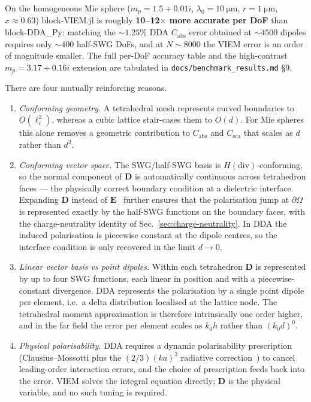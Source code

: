 \documentclass[11pt,a4paper]{article}
\begin{document}
On the homogeneous Mie sphere ($m_p = 1.5 + 0.01 i$,
$\lambda_0 = \SI{10}{\micro\metre}$, $r = \SI{1}{\micro\metre}$,
$x \approx 0.63$) block-VIEM.jl is roughly \textbf{10--12$\times$
more accurate per DoF} than block-DDA\_Py: matching the
$\sim 1.25\%$ DDA $C_{\text{abs}}$ error obtained at $\sim 4500$
dipoles requires only $\sim 400$ half-SWG DoFs, and at $N \sim 8000$
the VIEM error is an order of magnitude smaller.  The full
per-DoF accuracy table and the high-contrast $m_p = 3.17 + 0.16 i$
extension are tabulated in
\texttt{docs/benchmark\_results.md} \S 9.

There are four mutually reinforcing reasons.
\begin{enumerate}
  \item \emph{Conforming geometry.} A tetrahedral mesh represents
        curved boundaries to $O(\ell_c^{2})$, whereas a cubic lattice
        stair-cases them to $O(d)$. For Mie spheres this alone removes
        a geometric contribution to $C_{\text{abs}}$ and
        $C_{\text{sca}}$ that scales as $d$ rather than $d^{2}$.
  \item \emph{Conforming vector space.} The SWG/half-SWG basis is
        $H(\mathrm{div})$-conforming, so the normal component of
        $\bm{D}$ is automatically continuous across tetrahedron faces
        --- the physically correct boundary condition at a dielectric
        interface. Expanding $\bm{D}$ instead of
        $\bm{E}$~\cite[Sec.~II.B]{SWG1984} further ensures that the
        polarisation jump at $\partial\Omega$ is represented exactly
        by the half-SWG functions on the boundary faces, with the
        charge-neutrality identity of Sec.~\ref{sec:charge-neutrality}.
        In DDA the induced polarisation is piecewise constant at the
        dipole centres, so the interface condition is only recovered
        in the limit $d\to 0$.
  \item \emph{Linear vector basis vs point dipoles.} Within each
        tetrahedron $\bm{D}$ is represented by up to four SWG
        functions, each linear in position and with a piecewise-constant
        divergence. DDA represents the polarisation by a single point
        dipole per element, i.e.\ a delta distribution localised at
        the lattice node. The tetrahedral moment approximation is
        therefore intrinsically one order higher, and in the far field
        the error per element scales as $k_0 h$ rather than
        $(k_0 d)^{0}$.
  \item \emph{Physical polarisability.} DDA requires a dynamic
        polarisability prescription (Clausius--Mossotti plus the
        $(2/3)(ka)^{3}$ radiative correction~\cite{Draine1988}) to
        cancel leading-order interaction errors, and the choice of
        prescription feeds back into the error. VIEM solves the
        integral equation directly; $\bm{D}$ is the physical variable,
        and no such tuning is required.
\end{enumerate}
\end{document}

